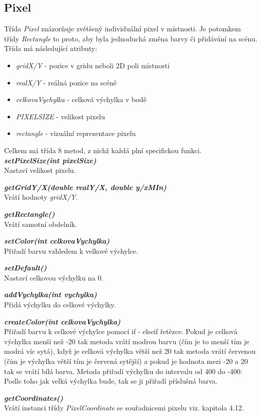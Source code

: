 \subsection{Pixel}
Třída \textit{Pixel} znázorňuje zvětšený individuální pixel v místnosti. Je  potomkem třídy \textit{Rectangle} to proto, aby byla jednoduchá změna barvy či přidávání na scénu. 
Třída má následující atributy:
\begin{itemize}
    \item \textit{gridX/Y} -  pozice v gridu neboli 2D poli místnosti 
    \item \textit{realX/Y} -  reálná pozice na scéně
    \item \textit{celkovaVychylka} -  celková výchylka v bodě
    \item \textit{PIXELSIZE} - velikost pixelu
    \item \textit{rectangle} - vizuální reprezentace pixelu
\end{itemize}

Celkem má třída 8 metod, z nichž každá plní specifickou funkci.\\

\textbf{\textit{setPixelSize(int pixelSize)}}\\
Nastaví velikost pixelu.

\vspace{0.3cm}
\textbf{\textit{getGridY/X(double realY/X, double y/xMIn)}}\\
Vrátí hodnoty \textit{gridX/Y}. 

\vspace{0.3cm}
\textbf{\textit{getRectangle()}}\\
Vrátí samotní obdelník.

\vspace{0.3cm}
\textbf{\textit{setColor(int celkovaVychylka)}}\\
Přiřadí barvu vzhledem k velkové výchylce.

\vspace{0.3cm}
\textbf{\textit{setDefault()}}\\
Nastaví celkovou výchylku na 0.

\vspace{0.3cm}
\textbf{\textit{addVychylka(int vychylka)}}\\
Přidá výchylku do celkové výchylky.

\vspace{0.3cm}
\textbf{\textit{createColor(int celkovaVychylka)}}\\
Přiřadí barvu k celkové výchylce pomocí if - elseif řetězce. Pokud je celková výchylka menší než -20 tak metoda vrátí modrou barvu (čím je to menší tím je modrá víc sytá), když je celková výchylka větší než 20 tak metoda vrátí červenou (čím je výchylka větší tím je červená sytější) a pokud je hodnota mezi -20 a 20 tak se vrátí bílá barva. Metoda přiřadí výchylku do intervalu od 400 do -400. Podle toho jak velká výchylka bude, tak se ji přiřadí příslušná barva.

\vspace{0.3cm}
\textbf{\textit{getCoordinates()}}\\
Vrátí instanci třídy \textit{PixelCoordinate} se souřadnicemi pixelu viz. kapitola 4.12.
